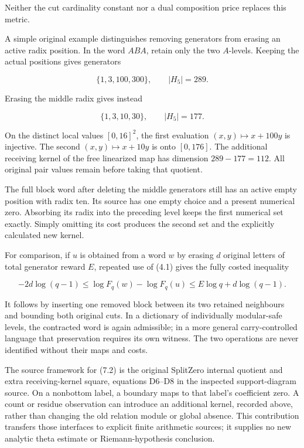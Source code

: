 \documentclass[11pt,a4paper]{article}
\begin{document}
Neither the cut cardinality constant nor a dual composition price replaces this metric.

A simple original example distinguishes removing generators from erasing an active radix position. In the word \(ABA\), retain only the two \(A\)-levels. Keeping the actual positions gives generators

\[
\{1,3,100,300\},\qquad |H_5|=289.
\]

Erasing the middle radix gives instead

\[
\{1,3,10,30\},\qquad |H_5|=177.
\]

On the distinct local values \([0,16]^2\), the first evaluation \((x,y)\mapsto x+100y\) is injective. The second \((x,y)\mapsto x+10y\) is onto \([0,176]\). The additional receiving kernel of the free linearized map has dimension \(289-177=112\). All original pair values remain before taking that quotient.

The full block word after deleting the middle generators still has an active empty position with radix ten. Its source has one empty choice and a present numerical zero. Absorbing its radix into the preceding level keeps the first numerical set exactly. Simply omitting its cost produces the second set and the explicitly calculated new kernel.

For comparison, if \(u\) is obtained from a word \(w\) by erasing \(d\) original letters of total generator reward \(E\), repeated use of (4.1) gives the fully costed inequality

\[
-2d\log(q-1)\le\log F_q(w)-\log F_q(u)
\le E\log q+d\log(q-1).
\tag{7.4}
\]

It follows by inserting one removed block between its two retained neighbours and bounding both original cuts. In a dictionary of individually modular-safe levels, the contracted word is again admissible; in a more general carry-controlled language that preservation requires its own witness. The two operations are never identified without their maps and costs.

The source framework for (7.2) is the original SplitZero internal quotient and extra receiving-kernel square, equations D6--D8 in the inspected support-diagram source. On a nonbottom label, a boundary maps to that label's coefficient zero. A count or residue observation can introduce an additional kernel, recorded above, rather than changing the old relation module or global absence. This contribution transfers those interfaces to explicit finite arithmetic sources; it supplies no new analytic theta estimate or Riemann-hypothesis conclusion.
\end{document}
